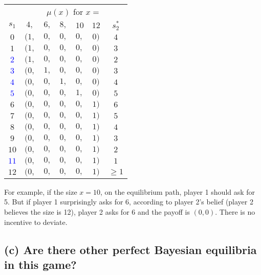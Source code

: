 \documentclass{article}
\begin{document}
\begin{mdframed}[backgroundcolor=blue!20,linecolor=white]
\begin{center}
\begin{tabular}{|c|ccccc|c|}
\multicolumn{1}{c}{} & \multicolumn{6}{c}{$\mu(x)$ for $x =$}  \\
$s_1$ & $4,$ & $6,$ & $8,$ & $10$ & $12$ & $s_2^*$  \\   \cline{1-7}
$0$ & $(1,$ & $0,$ & $0,$ & $0,$ & $0)$ & $4$ \\   
$1$ & $(1,$ & $0,$ & $0,$ & $0,$ & $0)$ & $3$ \\    \hline 
\textcolor{blue}{$2$} & $(1,$ & $0,$ & $0,$ & $0,$ & $0)$ & $2$ \\   
\textcolor{blue}{$3$} & $(0,$ & $1,$ & $0,$ & $0,$ & $0)$ & $3$ \\   
\textcolor{blue}{$4$} & $(0,$ & $0,$ & $1,$ & $0,$ & $0)$ & $4$ \\   
\textcolor{blue}{$5$} & $(0,$ & $0,$ & $0,$ & $1,$ & $0)$ & $5$ \\  \hline  
$6$ & $(0,$ & $0,$ & $0,$ & $0,$ & $1)$ & $6$ \\   
$7$ & $(0,$ & $0,$ & $0,$ & $0,$ & $1)$ & $5$ \\   
$8$ & $(0,$ & $0,$ & $0,$ & $0,$ & $1)$ & $4$ \\   
$9$ & $(0,$ & $0,$ & $0,$ & $0,$ & $1)$ & $3$ \\   
$10$& $(0,$ & $0,$ & $0,$ & $0,$ & $1)$ & $2$ \\  \hline    
\textcolor{blue}{$11$}& $(0,$ & $0,$ & $0,$ & $0,$ & $1)$ & $1$ \\ \hline 
$12$ & $(0,$ & $0,$ & $0,$ & $0,$ & $1)$ & $\ge 1$ \\   
\end{tabular}
\end{center}

For example, if the size $x=10$, on the equilibrium path, player 1 should ask for
5. But if player 1 surprisingly asks for 6, according to player 2's belief (player 2 
believes the size is 12), player 2 asks for 6 and the payoff is $(0,0)$. There is no incentive to deviate.
\end{mdframed}

\subsection*{(c) Are there other perfect Bayesian equilibria in this game?} %
\end{document}
